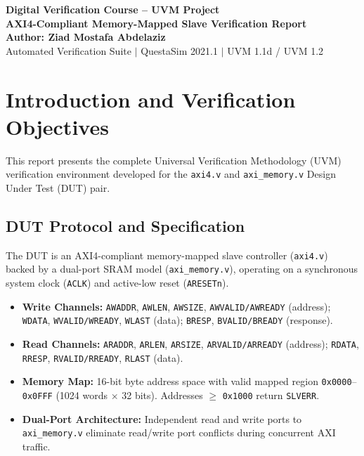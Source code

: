 \documentclass[10pt,a4paper]{article}
\begin{document}
\begin{center}
    {\LARGE \bfseries \color{primary} Digital Verification Course -- UVM Project}\\[4pt]
    {\Large \bfseries AXI4-Compliant Memory-Mapped Slave Verification Report}\\[6pt]
    {\large \bfseries Author: Ziad Mostafa Abdelaziz}\\[2pt]
    {\small \color{gray} Automated Verification Suite $|$ QuestaSim 2021.1 $|$ UVM 1.1d / UVM 1.2}
\end{center}

\tableofcontents
\newpage

\section{Introduction and Verification Objectives}
This report presents the complete Universal Verification Methodology (UVM) verification environment developed for the \texttt{axi4.v} and \texttt{axi\_memory.v} Design Under Test (DUT) pair.

\subsection{DUT Protocol and Specification}
The DUT is an AXI4-compliant memory-mapped slave controller (\texttt{axi4.v}) backed by a dual-port SRAM model (\texttt{axi\_memory.v}), operating on a synchronous system clock (\texttt{ACLK}) and active-low reset (\texttt{ARESETn}).
\begin{itemize}
    \item \textbf{Write Channels:} \texttt{AWADDR}, \texttt{AWLEN}, \texttt{AWSIZE}, \texttt{AWVALID/AWREADY} (address); \texttt{WDATA}, \texttt{WVALID/WREADY}, \texttt{WLAST} (data); \texttt{BRESP}, \texttt{BVALID/BREADY} (response).
    \item \textbf{Read Channels:} \texttt{ARADDR}, \texttt{ARLEN}, \texttt{ARSIZE}, \texttt{ARVALID/ARREADY} (address); \texttt{RDATA}, \texttt{RRESP}, \texttt{RVALID/RREADY}, \texttt{RLAST} (data).
    \item \textbf{Memory Map:} 16-bit byte address space with valid mapped region \texttt{0x0000}--\texttt{0x0FFF} (1024 words $\times$ 32 bits). Addresses $\geq$ \texttt{0x1000} return \texttt{SLVERR}.
    \item \textbf{Dual-Port Architecture:} Independent read and write ports to \texttt{axi\_memory.v} eliminate read/write port conflicts during concurrent AXI traffic.
\end{itemize}
\end{document}
